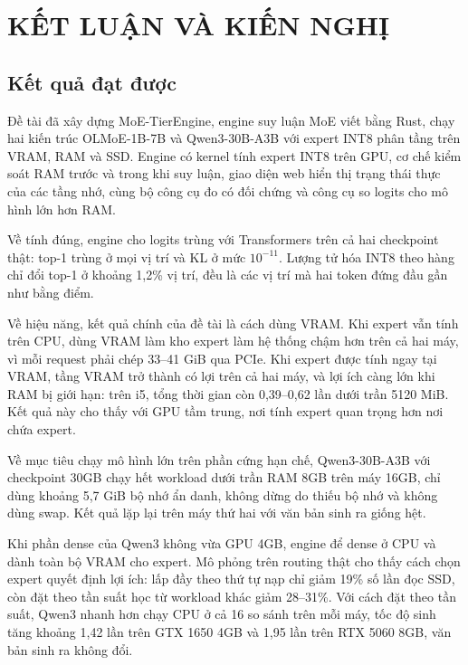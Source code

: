 \chapter*{KẾT LUẬN VÀ KIẾN NGHỊ}

\section*{Kết quả đạt được}

Đề tài đã xây dựng MoE-TierEngine, engine suy luận MoE viết bằng Rust, chạy hai kiến trúc OLMoE-1B-7B và Qwen3-30B-A3B với expert INT8 phân tầng trên VRAM, RAM và SSD. Engine có kernel tính expert INT8 trên GPU, cơ chế kiểm soát RAM trước và trong khi suy luận, giao diện web hiển thị trạng thái thực của các tầng nhớ, cùng bộ công cụ đo có đối chứng và công cụ so logits cho mô hình lớn hơn RAM.

Về tính đúng, engine cho logits trùng với Transformers trên cả hai checkpoint thật: top-1 trùng ở mọi vị trí và KL ở mức $10^{-11}$. Lượng tử hóa INT8 theo hàng chỉ đổi top-1 ở khoảng 1,2\% vị trí, đều là các vị trí mà hai token đứng đầu gần như bằng điểm.

Về hiệu năng, kết quả chính của đề tài là cách dùng VRAM. Khi expert vẫn tính trên CPU, dùng VRAM làm kho expert làm hệ thống chậm hơn trên cả hai máy, vì mỗi request phải chép 33--41 GiB qua PCIe. Khi expert được tính ngay tại VRAM, tầng VRAM trở thành có lợi trên cả hai máy, và lợi ích càng lớn khi RAM bị giới hạn: trên i5, tổng thời gian còn 0,39--0,62 lần dưới trần 5120 MiB. Kết quả này cho thấy với GPU tầm trung, nơi tính expert quan trọng hơn nơi chứa expert.

Về mục tiêu chạy mô hình lớn trên phần cứng hạn chế, Qwen3-30B-A3B với checkpoint 30GB chạy hết workload dưới trần RAM 8GB trên máy 16GB, chỉ dùng khoảng 5,7 GiB bộ nhớ ẩn danh, không dừng do thiếu bộ nhớ và không dùng swap. Kết quả lặp lại trên máy thứ hai với văn bản sinh ra giống hệt.

Khi phần dense của Qwen3 không vừa GPU 4GB, engine để dense ở CPU và dành toàn bộ VRAM cho expert. Mô phỏng trên routing thật cho thấy cách chọn expert quyết định lợi ích: lấp đầy theo thứ tự nạp chỉ giảm 19\% số lần đọc SSD, còn đặt theo tần suất học từ workload khác giảm 28--31\%. Với cách đặt theo tần suất, Qwen3 nhanh hơn chạy CPU ở cả 16 so sánh trên mỗi máy, tốc độ sinh tăng khoảng 1,42 lần trên GTX 1650 4GB và 1,95 lần trên RTX 5060 8GB, văn bản sinh ra không đổi.

